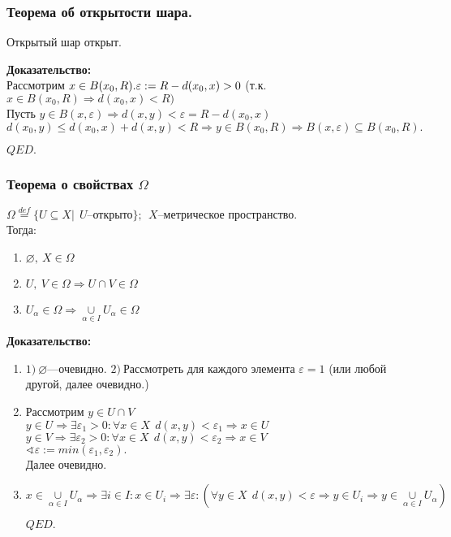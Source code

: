 \documentclass[10pt]{report}
\begin{document}
\subsubsection{Теорема об открытости шара.}
Открытый шар открыт.
\begin{spacing}{1.5}
 \textbf{Доказательство:}\\
Рассмотрим $ x\in B(x_{0}, R).  \\
  \varepsilon :=R-d(x_{0}, x)>0 $
 (т.к. $x\in B(x_{0}, R)\Rightarrow d(x_{0}, x)<R)$
 \\Пусть $y\in B(x, \varepsilon)\Rightarrow d(x, y)<\varepsilon = R-d(x_{0}, x) $
 \\$d(x_{0}, y)\leq d(x_{0}, x)+d(x, y)<R\Rightarrow y\in B(x_{0}, R)\Rightarrow B(x, \varepsilon)\subseteq B(x_{0}, R). $
\begin{flushright}
$QED.$
\end{flushright}
\subsubsection{Теорема о свойствах $\Omega$}
$\Omega \overset{def}{=} \lbrace U\subseteq X |~~ U$--открыто$\rbrace;~~X$--метрическое пространство.
\\Тогда:
\begin{enumerate}
\item $\varnothing ,~X\in \Omega$
\item $U,~V\in \Omega \Rightarrow U\cap V\in \Omega$
\item $U_{\alpha}\in \Omega \Rightarrow \underset{\alpha\in I}{\cup}U_{\alpha}\in \Omega$
\end{enumerate}
 \textbf{Доказательство:}
 \begin{enumerate}
 	\item 
 	$1)~\varnothing$---очевидно.
 	$2)~$Рассмотреть для каждого элемента $\varepsilon=1$ (или любой другой, далее очевидно.)
 	\item Рассмотрим $ y\in U\cap V$
 	\\$y\in U \Rightarrow \exists \varepsilon_{1}>0:\forall x\in X~~ d(x, y)<\varepsilon_{1}\Rightarrow x\in U$
 	\\$y\in V \Rightarrow \exists \varepsilon_{2}>0:\forall x\in X~~ d(x, y)<\varepsilon_{2}\Rightarrow x\in V$
 	\\$\sphericalangle \varepsilon:=min(\varepsilon_{1}, \varepsilon_{2}).$
 	\\Далее очевидно.
 	\item $x\in \underset{\alpha\in I}{\cup}U_{\alpha}\Rightarrow \exists i\in I: x\in U_{i}\Rightarrow\exists\varepsilon : (\forall y\in X~~ d(x, y)<\varepsilon\Rightarrow y\in U_{i}\Rightarrow y\in \underset{\alpha\in I}{\cup}U_{\alpha}) $
 	\begin{flushright}
$QED.$
\end{flushright}
\end{enumerate}

\end{spacing}
\end{document}
